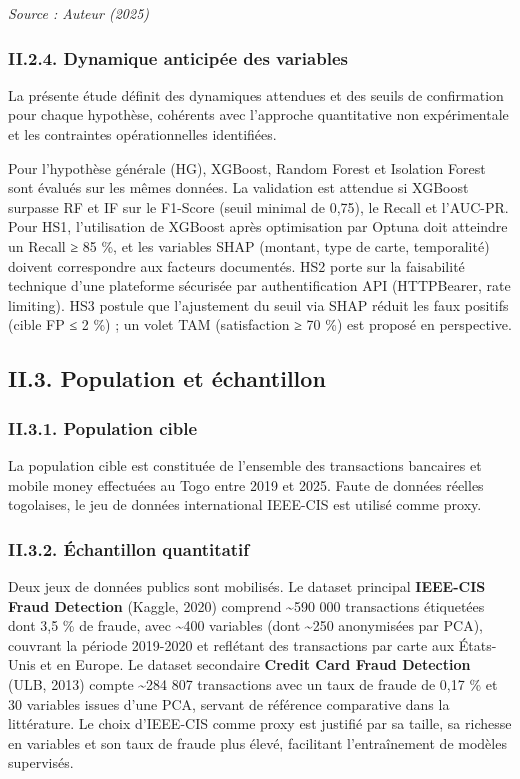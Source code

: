 \documentclass[
  12pt,
]{article}
\begin{document}
\emph{Source : Auteur (2025)}

\subsubsection{II.2.4. Dynamique anticipée des
variables}\label{ii.2.4.-dynamique-anticipuxe9e-des-variables}

La présente étude définit des dynamiques attendues et des seuils de
confirmation pour chaque hypothèse, cohérents avec l’approche
quantitative non expérimentale et les contraintes opérationnelles
identifiées.

Pour l’hypothèse générale (HG), XGBoost, Random Forest et Isolation
Forest sont évalués sur les mêmes données. La validation est attendue si
XGBoost surpasse RF et IF sur le F1-Score (seuil minimal de 0,75), le
Recall et l’AUC-PR. Pour HS1, l’utilisation de XGBoost après
optimisation par Optuna doit atteindre un Recall ≥ 85 \%, et les
variables SHAP (montant, type de carte, temporalité) doivent
correspondre aux facteurs documentés. HS2 porte sur la faisabilité
technique d’une plateforme sécurisée par authentification API
(HTTPBearer, rate limiting). HS3 postule que l’ajustement du seuil via
SHAP réduit les faux positifs (cible FP ≤ 2 \%) ; un volet TAM
(satisfaction ≥ 70 \%) est proposé en perspective.

\subsection{II.3. Population et
échantillon}\label{ii.3.-population-et-uxe9chantillon}

\subsubsection{II.3.1. Population cible}\label{ii.3.1.-population-cible}

La population cible est constituée de l’ensemble des transactions
bancaires et mobile money effectuées au Togo entre 2019 et 2025. Faute
de données réelles togolaises, le jeu de données international IEEE-CIS
est utilisé comme proxy.

\subsubsection{II.3.2. Échantillon
quantitatif}\label{ii.3.2.-uxe9chantillon-quantitatif}

Deux jeux de données publics sont mobilisés. Le dataset principal
\textbf{IEEE-CIS Fraud Detection} (Kaggle, 2020) comprend
\textasciitilde590 000 transactions étiquetées dont 3,5 \% de fraude,
avec \textasciitilde400 variables (dont \textasciitilde250 anonymisées
par PCA), couvrant la période 2019-2020 et reflétant des transactions
par carte aux États-Unis et en Europe. Le dataset secondaire
\textbf{Credit Card Fraud Detection} (ULB, 2013) compte
\textasciitilde284 807 transactions avec un taux de fraude de 0,17 \% et
30 variables issues d’une PCA, servant de référence comparative dans la
littérature. Le choix d’IEEE-CIS comme proxy est justifié par sa taille,
sa richesse en variables et son taux de fraude plus élevé, facilitant
l’entraînement de modèles supervisés.
\end{document}

